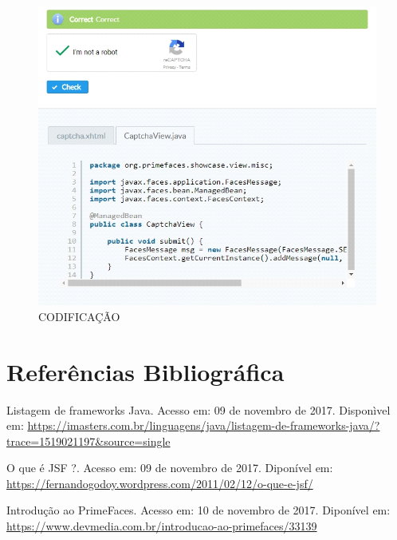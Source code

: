 \documentclass[12pt,a4paper]{article}
\begin{document}
\noindent \begin{figure}[h] \label{Figura:PrymeFaces} \caption{CODIFICAÇÃO} \centering \includegraphics[width=17cm]{recursos/imagens/img06.png}\end{figure}

\vspace{10cm}

\section{Referências Bibliográfica}
\noindent 
Listagem de frameworks Java. Acesso em: 09 de novembro de 2017. Disponìvel em: \url {https://imasters.com.br/linguagens/java/listagem-de-frameworks-java/?trace=1519021197&source=single}
\vspace{0.2cm}

\noindent
O que é JSF ?. Acesso em: 09 de novembro de 2017. Diponível em: \url{https://fernandogodoy.wordpress.com/2011/02/12/o-que-e-jsf/}
\vspace{0.2cm}

\noindent 
Introdução ao PrimeFaces. Acesso em: 10 de novembro de 2017. Diponível em: \url{https://www.devmedia.com.br/introducao-ao-primefaces/33139}
\end{document}
